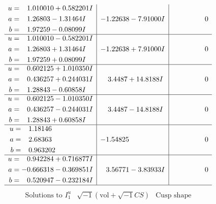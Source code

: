 \documentclass[1p]{elsarticle_modified}
\theoremstyle{definition}
\newcommand{\I}{\sqrt{-1}}
\begin{document}
$$\begin{array}{c|c|c}
\begin{aligned}
u &= \phantom{-}1.010010 + 0.582201 I \\
a &= \phantom{-}1.26803 - 1.31464 I \\
b &= \phantom{-}1.97259 - 0.08099 I\end{aligned}
 & -1.22638 - 7.91000 I & \phantom{-0.000000 } 0 \\ \hline\begin{aligned}
u &= \phantom{-}1.010010 - 0.582201 I \\
a &= \phantom{-}1.26803 + 1.31464 I \\
b &= \phantom{-}1.97259 + 0.08099 I\end{aligned}
 & -1.22638 + 7.91000 I & \phantom{-0.000000 } 0 \\ \hline\begin{aligned}
u &= \phantom{-}0.602125 + 1.010350 I \\
a &= \phantom{-}0.436257 + 0.244031 I \\
b &= \phantom{-}1.28843 - 0.60858 I\end{aligned}
 & \phantom{-}3.4487 + 14.8188 I & \phantom{-0.000000 } 0 \\ \hline\begin{aligned}
u &= \phantom{-}0.602125 - 1.010350 I \\
a &= \phantom{-}0.436257 - 0.244031 I \\
b &= \phantom{-}1.28843 + 0.60858 I\end{aligned}
 & \phantom{-}3.4487 - 14.8188 I & \phantom{-0.000000 } 0 \\ \hline\begin{aligned}
u &= \phantom{-}1.18146\phantom{ +0.000000I} \\
a &= \phantom{-}2.68363\phantom{ +0.000000I} \\
b &= \phantom{-}0.963202\phantom{ +0.000000I}\end{aligned}
 & -1.54825\phantom{ +0.000000I} & \phantom{-0.000000 } 0 \\ \hline\begin{aligned}
u &= \phantom{-}0.942284 + 0.716877 I \\
a &= -0.666318 - 0.369851 I \\
b &= \phantom{-}0.520947 - 0.232184 I\end{aligned}
 & \phantom{-}3.56771 - 3.83933 I & \phantom{-0.000000 } 0\\
 \hline 
 \end{array}$$\newpage$$\begin{array}{c|c|c}  
\text{Solutions to }I^u_{1}& \I (\text{vol} + \sqrt{-1}CS) & \text{Cusp shape}\\

\end{array}$$
\end{document}
